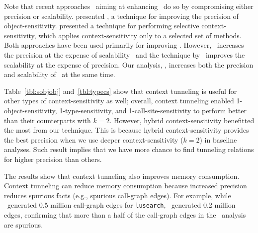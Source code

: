 Note that recent
approaches~\cite{TanLX16,JeJeChOh17} aiming at enhancing \twosobjH~do
so by compromising either precision or scalability.
\cite{TanLX16} presented \Bean, a technique for improving the
precision of object-sensitivity.  \cite{JeJeChOh17} presented a
technique for performing selective context-sensitivity, which applies
context-sensitivity only to a selected set of methods. Both approaches
have been used primarily for improving \twosobjH. However,
\Bean~increases the precision at the expense of scalability~\cite{TanLX16}
and the technique by~\cite{JeJeChOh17} improves the scalability at the
expense of precision. Our analysis, \onesobjHT, increases both the precision and scalability of \onesobjH~at
the same time.







Table~\ref{tbl:sobjobj} and~\ref{tbl:typecs} show that context
tunneling is useful for other types of context-sensitivity as well;
overall, context tunneling enabled 1-object-sensitivity,
1-type-sensitivity, and 1-call-site-sensitivity to perform better than
their counterparts with $k=2$. However, hybrid context-sensitivity
benefitted the most from our technique.
This is because hybrid context-sensitivity provides the best precision
when we use deeper context-sensitivity ($k=2$) in baseline analyses.
Such result implies that we have more chance to find tunneling relations for higher precision than
others.

The results show that context tunneling also improves memory
consumption.
Context tunneling can reduce memory consumption because increased
precision reduces spurious facts (e.g., spurious call-graph
edges). For example, while \oneobjH~generated 0.5 million call-graph edges
for {\tt lusearch}, \onesobjHT~generated 0.2 million edges, confirming
that more than a half of the call-graph edges in the \oneobjH~analysis
are spurious.




